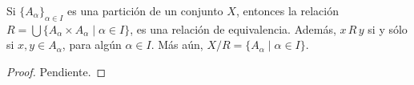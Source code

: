 
\begin{theorem}
Si $\{ A_{\alpha} \}_{\alpha \in I}$ es una partición de un conjunto $X$, entonces la relación $R = \bigcup \{ A_{\alpha} \times A_{\alpha} \mid \alpha \in I \}$, es una relación de equivalencia. Además, $x \, R \, y$ si y sólo si $x, y \in A_{\alpha}$, para algún $\alpha \in I$. Más aún, $X/R = \{ A_{\alpha} \mid \alpha \in I \}$.
\end{theorem}

\begin{proof}
Pendiente.
\end{proof}
